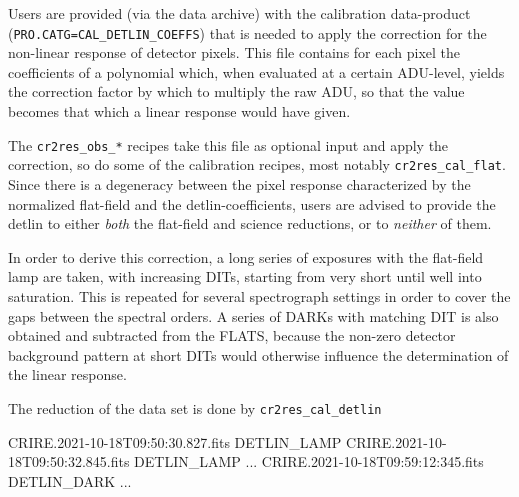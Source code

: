 

Users are provided (via the data archive) with the calibration data-product
(\verb!PRO.CATG=CAL_DETLIN_COEFFS!) that is needed to apply the correction for
the non-linear response of detector pixels. This file contains for each pixel
the coefficients of a polynomial which, when evaluated at a certain ADU-level,
yields the correction factor by which to multiply the raw ADU, so that the value
becomes that which a linear response would have given.

The \verb!cr2res_obs_*! recipes take
this file as optional input and apply the correction, so do some of the
calibration recipes, most notably \verb!cr2res_cal_flat!. Since there is a
degeneracy between the pixel response characterized by the normalized flat-field
and the detlin-coefficients, users are advised to provide the detlin to either
\emph{both} the flat-field and science reductions, or to \emph{neither} of them.


In order to derive this correction, a long series of exposures with the
flat-field lamp are taken, with increasing DITs, starting from very short until
well into saturation. This is repeated for several spectrograph settings in
order to cover the gaps between the spectral orders. A series of DARKs with
matching DIT is also obtained and subtracted from the FLATS, because the
non-zero detector background pattern at short DITs would otherwise influence the
determination of the linear response.

The reduction of the data set is done by \verb!cr2res_cal_detlin!
\begin{shell}[fontsize=\footnotesize]
    CRIRE.2021-10-18T09:50:30.827.fits DETLIN_LAMP
    CRIRE.2021-10-18T09:50:32.845.fits DETLIN_LAMP
    ...
    CRIRE.2021-10-18T09:59:12:345.fits DETLIN_DARK
    ...

\end{shell}

